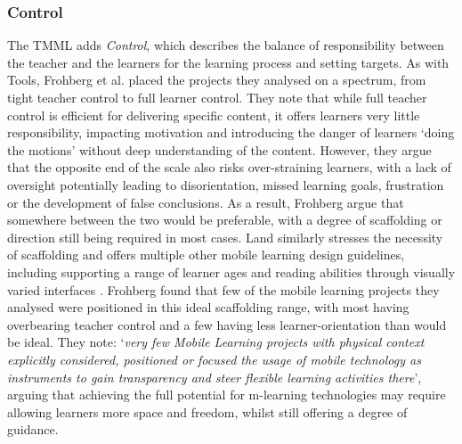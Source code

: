 \subsubsection{Control}
The TMML adds \textit{Control}, which describes the balance of responsibility between the teacher and the learners for the learning process and setting targets. As with Tools, Frohberg et al. placed the projects they analysed on a spectrum, from tight teacher control to full learner control. They note that while full teacher control is efficient for delivering specific content, it offers learners very little responsibility, impacting motivation and introducing the danger of learners `doing the motions' without deep understanding of the content. However, they argue that the opposite end of the scale also risks over-straining learners, with a lack of oversight potentially leading to disorientation, missed learning goals, frustration or the development of false conclusions. As a result, Frohberg argue that somewhere between the two would be preferable, with a degree of scaffolding or direction still being required in most cases. Land similarly stresses the necessity of scaffolding and offers multiple other mobile learning design guidelines, including supporting a range of learner ages and reading abilities through visually varied interfaces \citep{Land2015}. Frohberg found that few of the mobile learning projects they analysed were positioned in this ideal scaffolding range, with most having overbearing teacher control and a few having less learner-orientation than would be ideal. They note: `\textit{very few Mobile Learning projects with physical context explicitly considered, positioned or focused the usage of mobile technology as instruments to gain transparency and steer flexible learning activities there}', arguing that achieving the full potential for m-learning technologies may require allowing learners more space and freedom, whilst still offering a degree of guidance.


